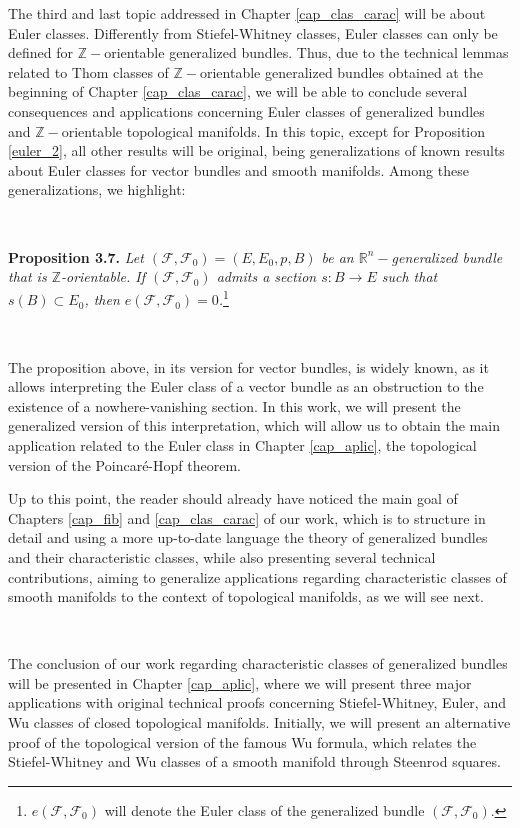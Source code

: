 \documentclass[12pt,oneside]{book}
\newcommand{\R}{\mathbb{R}}
\newcommand{\Z}{\mathbb{Z}}
\begin{document}
    The third and last topic addressed in Chapter \ref{cap_clas_carac} will be about Euler classes. 
    Differently from Stiefel-Whitney classes, Euler classes can only be defined for $\Z-$orientable 
    generalized bundles. Thus, due to the technical lemmas related to Thom classes of $\Z-$orientable 
    generalized bundles obtained at the beginning of Chapter \ref{cap_clas_carac}, we will be able to 
    conclude several consequences and applications concerning Euler classes of generalized bundles and 
    $\Z-$orientable topological manifolds. In this topic, except for Proposition \ref{euler_2}, all other 
    results will be original, being generalizations of known results about Euler classes for vector 
    bundles and smooth manifolds. Among these generalizations, we highlight:

    \

        \textbf{Proposition 3.7.} \textit{Let $(\mathcal{F},\mathcal{F}_{0})=(E,E_{0},p,B)$ be an 
        $\R^{n}-$generalized bundle that is $\Z$-orientable. If $(\mathcal{F},\mathcal{F}_{0})$ admits a 
        section $s:B\to E$ such that $s(B)\subset E_{0}$, then 
        $e(\mathcal{F},\mathcal{F}_{0})=0$.}\footnote{$e(\mathcal{F},\mathcal{F}_{0})$ will denote the Euler 
        class of the generalized bundle $(\mathcal{F},\mathcal{F}_{0})$.}
    
    \

    The proposition above, in its version for vector bundles, is widely known, as it allows interpreting 
    the Euler class of a vector bundle as an obstruction to the existence of a nowhere-vanishing section. 
    In this work, we will present the generalized version of this interpretation, which will allow us to 
    obtain the main application related to the Euler class in Chapter \ref{cap_aplic}, the topological 
    version of the Poincaré-Hopf theorem.

    Up to this point, the reader should already have noticed the main goal of Chapters \ref{cap_fib} and 
    \ref{cap_clas_carac} of our work, which is to structure in detail and using a more up-to-date 
    language the theory of generalized bundles and their characteristic classes, while also presenting 
    several technical contributions, aiming to generalize applications regarding characteristic classes 
    of smooth manifolds to the context of topological manifolds, as we will see next.

    \

    The conclusion of our work regarding characteristic classes of generalized bundles will be presented 
    in Chapter \ref{cap_aplic}, where we will present three major applications with original technical 
    proofs concerning Stiefel-Whitney, Euler, and Wu classes of closed topological manifolds. Initially, 
    we will present an alternative proof of the topological version of the famous Wu formula, which 
    relates the Stiefel-Whitney and Wu classes of a smooth manifold through Steenrod squares.
\end{document}
